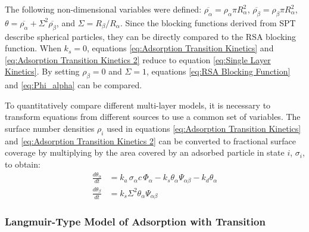 The following non-dimensional variables were defined: $\overline{\rho_{\alpha}}=\rho_{\alpha}\pi R_{\alpha}^{2}$,
$\overline{\rho_{\beta}}=\rho_{\beta}\pi R_{\alpha}^{2}$, $\theta=\overline{\rho_{\alpha}}+\Sigma^{2}\overline{\rho_{\beta}}$,
and $\Sigma=R_{\beta}/R_{\alpha}$. Since the blocking functions derived
from SPT describe spherical particles, they can be directly compared
to the RSA blocking function. When $k_{s}=0$, equations \ref{eq:Adsorption Transition Kinetics}
and \ref{eq:Adsorption Transition Kinetics 2} reduce to equation
\ref{eq:Single Layer Kinetics}. By setting $\rho_{\beta}=0$ and
$\Sigma=1$, equations \ref{eq:RSA Blocking Function} and \ref{eq:Phi_alpha}
can be compared.

To quantitatively compare different multi-layer models, it is necessary
to transform equations from different sources to use a common set
of variables. The surface number densities $\rho_{i}$ used in equations
\ref{eq:Adsorption Transition Kinetics} and \ref{eq:Adsorption Transition Kinetics 2}
can be converted to fractional surface coverage by multiplying by
the area covered by an adsorbed particle in state $i$, $\sigma_{i}$,
to obtain:\begin{align}
\frac{d\theta_{\alpha}}{dt} & =k_{a}\,\sigma_{\alpha}c\,\Phi_{\alpha}-k_{s}\theta_{\alpha}\Psi_{\alpha\beta}-k_{d}\theta_{\alpha}\label{eq:dtheta_alpha dt}\\
\frac{d\theta_{\beta}}{dt} & =k_{s}\Sigma^{2}\theta_{\alpha}\Psi_{\alpha\beta}\label{eq:dtheta_beta dt}\end{align}



\subsubsection{Langmuir-Type Model of Adsorption with Transition}

